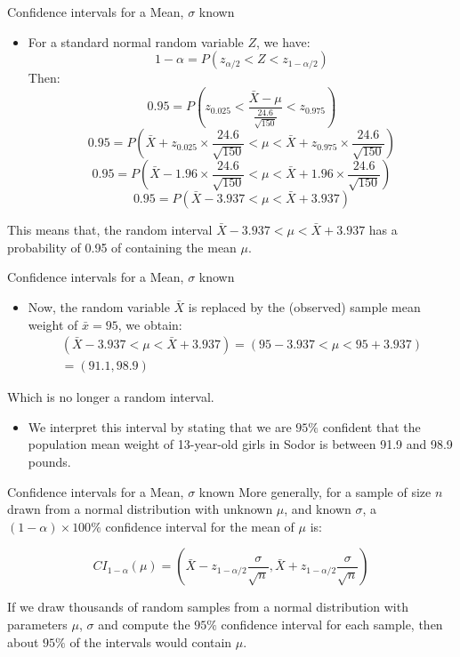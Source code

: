 \documentclass[
  ignorenonframetext,
]{beamer}
\providecommand{\tightlist}{%
  \setlength{\itemsep}{0pt}\setlength{\parskip}{0pt}}
\begin{document}
\begin{frame}{Confidence intervals for a Mean, \(\sigma\) known}
\protect\hypertarget{confidence-intervals-for-a-mean-sigma-known-2}{}
\begin{itemize}
\tightlist
\item
  For a standard normal random variable \(Z\), we have:
  \[1-\alpha=P(z_{\alpha/2}<Z<z_{1-\alpha/2})\] Then:
  \[0.95=P\left(z_{0.025}<\frac{\bar{X}-\mu}{\frac{24.6}{\sqrt{150}}}<z_{0.975}\right)\]
  \[0.95=P\left(\bar{X}+z_{0.025}\times\frac{24.6}{\sqrt{150}}<\mu<\bar{X}+z_{0.975}\times\frac{24.6}{\sqrt{150}}\right)\]
  \[0.95=P\left(\bar{X}-1.96\times\frac{24.6}{\sqrt{150}}<\mu<\bar{X}+1.96\times\frac{24.6}{\sqrt{150}}\right)\]
  \[0.95=P(\bar{X}-3.937<\mu<\bar{X}+3.937)\]
\end{itemize}

This means that, the random interval \(\bar{X}-3.937<\mu<\bar{X}+3.937\)
has a probability of 0.95 of containing the mean \(\mu\).
\end{frame}

\begin{frame}{Confidence intervals for a Mean, \(\sigma\) known}
\protect\hypertarget{confidence-intervals-for-a-mean-sigma-known-3}{}
\begin{itemize}
\tightlist
\item
  Now, the random variable \(\bar{X}\) is replaced by the (observed)
  sample mean weight of \(\bar{x}=95\), we obtain: \[\begin{array}{ll}
  (\bar{X}-3.937<\mu<\bar{X}+3.937)=(95-3.937<\mu<95+3.937)\\
  =(91.1, 98.9)\end{array}\]
\end{itemize}

Which is no longer a random interval.

\begin{itemize}
\tightlist
\item
  We interpret this interval by stating that we are \(95\%\) confident
  that the population mean weight of 13-year-old girls in Sodor is
  between 91.9 and 98.9 pounds.
\end{itemize}
\end{frame}

\begin{frame}{Confidence intervals for a Mean, \(\sigma\) known}
\protect\hypertarget{confidence-intervals-for-a-mean-sigma-known-4}{}
More generally, for a sample of size \(n\) drawn from a normal
distribution with unknown \(\mu\), and known \(\sigma\), a
\((1-\alpha)\times 100\%\) confidence interval for the mean of \(\mu\)
is:

\[CI_{1-\alpha}(\mu)=\left(\bar{X}-z_{1-\alpha/2}\frac{\sigma}{\sqrt{n}},\bar{X}+z_{1-\alpha/2}\frac{\sigma}{\sqrt{n}}\right)\]

If we draw thousands of random samples from a normal distribution with
parameters \(\mu\), \(\sigma\) and compute the \(95\%\) confidence
interval for each sample, then about \(95\%\) of the intervals would
contain \(\mu\).
\end{frame}
\end{document}
